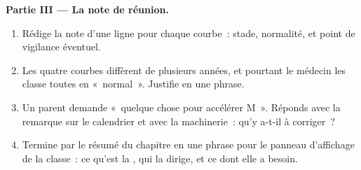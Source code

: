 \begin{problem}
\medskip\noindent\textbf{Partie III --- La note de
réunion.}
\begin{enumerate}[resume]
  \item Rédige la note d'une ligne pour chaque courbe~: stade,
        normalité, et point de vigilance éventuel.
  \item Les quatre courbes diffèrent de plusieurs années, et
        pourtant le médecin les classe toutes en «~normal~».
        Justifie en une phrase.
  \item Un parent demande «~quelque chose pour accélérer M~».
        Réponds avec la remarque sur le calendrier et avec la
        machinerie~: qu'y a-t-il à corriger~?
  \item Termine par le résumé du chapitre en une phrase pour le
        panneau d'affichage de la classe~: ce qu'est la ,
        qui la dirige, et ce dont elle a besoin.
\end{enumerate}
\end{problem}

